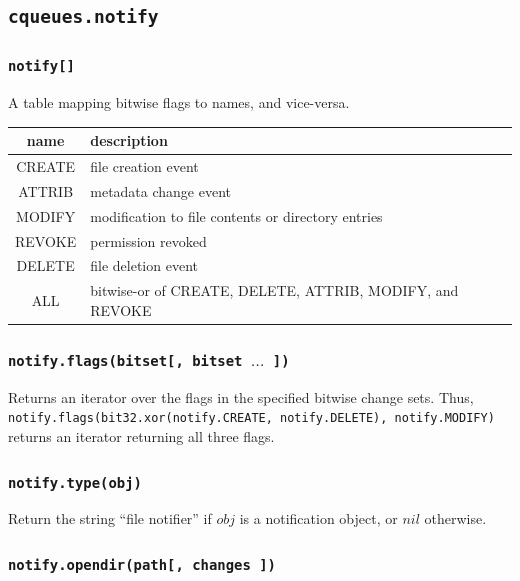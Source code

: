 \documentclass[11pt, oneside]{memoir}
\newcommand*{\routine}[1]{\texttt{#1}\xspace}
\newcommand*{\fn}[1]{\texttt{#1}\xspace}
\newcounter{toccols}
\newenvironment{Module}[1]{
	\subsection{\texttt{#1}}
	\addtocontents{toc}{
		\protect\begin{multicols}{\value{toccols}}
	}
}{
	\addtocontents{toc}{\protect\end{multicols}}
}
\begin{document}
\begin{Module}{cqueues.notify}

\subsubsection[\fn{notify[]}]{\fn{notify[]}}
A table mapping bitwise flags to names, and vice-versa.

\begin{tabular}{c | l}

name & description \\\hline
CREATE & file creation event \\
ATTRIB & metadata change event \\
MODIFY & modification to file contents or directory entries \\ 
REVOKE & permission revoked \\
DELETE & file deletion event \\
ALL    & bitwise-or of CREATE, DELETE, ATTRIB, MODIFY, and REVOKE
\end{tabular}

\subsubsection[\fn{notify.flags}]{\fn{notify.flags(bitset[, bitset $\ldots$ ])}}

Returns an iterator over the flags in the specified bitwise change sets. Thus, \texttt{notify.flags(bit32.xor(notify.CREATE, notify.DELETE), notify.MODIFY)} returns an iterator returning all three flags.

\subsubsection[\routine{notify.type}]{\routine{notify.type(obj)}}
Return the string ``file notifier'' if $obj$ is a notification object, or $nil$ otherwise.

\subsubsection[\fn{notify.opendir}]{\fn{notify.opendir(path[, changes ])}}


\end{Module}
\end{document}
